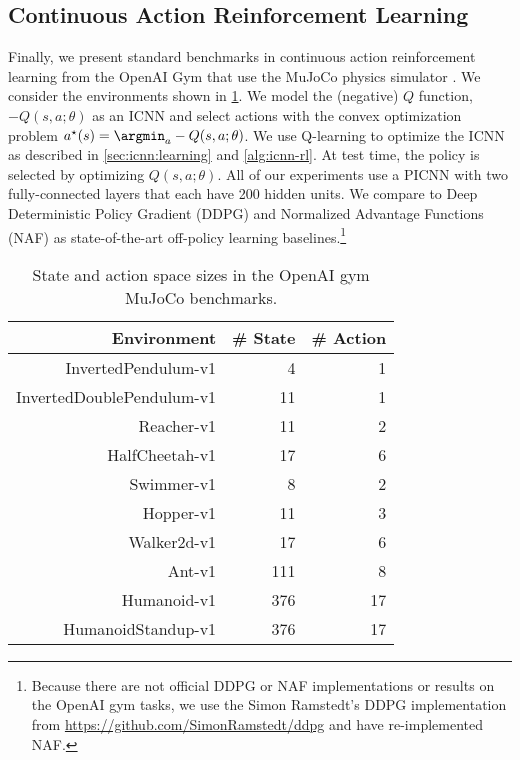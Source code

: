 \subsection{Continuous Action Reinforcement Learning}
Finally, we present standard benchmarks in continuous action reinforcement
learning from the OpenAI Gym \citep{brockman2016openai} that use the
MuJoCo physics simulator \citep{todorov2012mujoco}.
We consider the environments shown in \cref{tab:gym-szs}.
We model the (negative) $Q$ function,
$-Q(s,a;\theta)$ as an ICNN and select actions with
the convex optimization problem
$a^\star(s) = \argmin_a -Q(s,a;\theta)$.
We use Q-learning to optimize the ICNN as described in
\cref{sec:icnn:learning} and
\cref{alg:icnn-rl}.
At test time, the policy is selected by optimizing $Q(s, a; \theta)$.
All of our experiments use a PICNN with two fully-connected
layers that each have 200 hidden units.
We compare to Deep Deterministic Policy Gradient (DDPG) \citep{lillicrap2015continuous}
and Normalized Advantage Functions (NAF) \citep{gu2016continuous}
as state-of-the-art off-policy learning baselines.\footnote{Because there are
not official DDPG or NAF implementations or
results on the OpenAI gym tasks, we use the Simon Ramstedt's
DDPG implementation from \url{https://github.com/SimonRamstedt/ddpg}
and have re-implemented NAF.}

\begin{table}[H]
  \centering
  \begin{tabular}{rrr}
    Environment & \# State & \# Action \\ \hline
    InvertedPendulum-v1	& 4 & 1 \\
    InvertedDoublePendulum-v1	& 11 & 1 \\
    Reacher-v1	& 11 & 2 \\
    HalfCheetah-v1	& 17 & 6 \\
    Swimmer-v1	& 8 & 2 \\
    Hopper-v1	& 11 & 3 \\
    Walker2d-v1	& 17 & 6 \\ %
    Ant-v1	& 111 & 8 \\
    Humanoid-v1	& 	376 & 17 \\
    HumanoidStandup-v1	& 	376 & 17 \\
  \end{tabular}
  \caption{State and action space sizes in the OpenAI gym MuJoCo benchmarks.}
  \label{tab:gym-szs}
\end{table}


